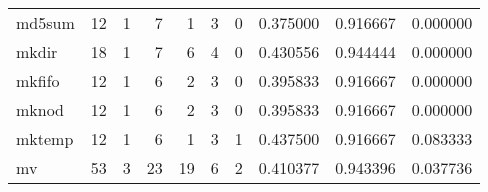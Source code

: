 \begin{longtable}{lrrrrrrrrr}
md5sum    &                                       12 &                                                  1 &                                                  7 &                                                  1 &                                                  3 &                                                  0 &                                           0.375000 &                               0.916667 &                             0.000000 \\
mkdir     &                                       18 &                                                  1 &                                                  7 &                                                  6 &                                                  4 &                                                  0 &                                           0.430556 &                               0.944444 &                             0.000000 \\
mkfifo    &                                       12 &                                                  1 &                                                  6 &                                                  2 &                                                  3 &                                                  0 &                                           0.395833 &                               0.916667 &                             0.000000 \\
mknod     &                                       12 &                                                  1 &                                                  6 &                                                  2 &                                                  3 &                                                  0 &                                           0.395833 &                               0.916667 &                             0.000000 \\
mktemp    &                                       12 &                                                  1 &                                                  6 &                                                  1 &                                                  3 &                                                  1 &                                           0.437500 &                               0.916667 &                             0.083333 \\
mv        &                                       53 &                                                  3 &                                                 23 &                                                 19 &                                                  6 &                                                  2 &                                           0.410377 &                               0.943396 &                             0.037736 \\

\end{longtable}
